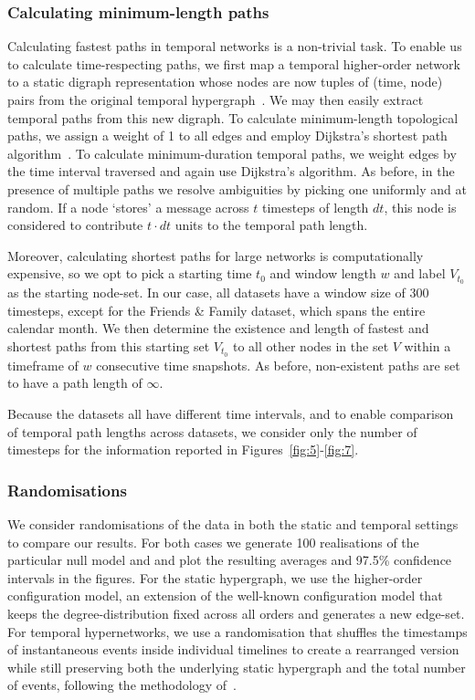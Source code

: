 \documentclass[a4paper,pre,reqno,superscriptaddress, twocolumn, floatfix]{revtex4}
\def\ho{higher-order }
\begin{document}
\subsubsection*{Calculating minimum-length paths}


Calculating fastest paths in temporal networks is a non-trivial task. To enable us to calculate time-respecting paths, we first map a temporal \ho network to a static digraph representation whose nodes are now tuples of (time, node) pairs from the original temporal hypergraph~\cite{valdano2015analytical, sato2019dyane}. We may then easily extract temporal paths from this new digraph. To calculate minimum-length topological paths, we assign a weight of 1 to all edges and employ Dijkstra's shortest path algorithm~\cite{cormen2001section}. To calculate minimum-duration temporal paths, we weight edges by the time interval traversed and again use Dijkstra's algorithm.  As before, in the presence of multiple paths we resolve ambiguities by picking one uniformly and at random. If a node `stores' a message across $t$ timesteps of length $dt$, this node is considered to contribute $t\cdot{dt}$ units to the temporal path length. 

Moreover, calculating shortest paths for large networks is computationally expensive, so we opt to pick a starting time $t_0$ and window length $w$ and label $V_{t_0}$ as the starting node-set. In our case, all datasets have a window size of 300 timesteps, except for the Friends \& Family dataset, which spans the entire calendar month. We then determine the existence and length of fastest and shortest paths from this starting set $V_{t_0}$ to all other nodes in the set $V$ within a timeframe of $w$ consecutive time snapshots. As before, non-existent paths are set to have a path length of $\infty$.

Because the datasets all have different time intervals, and to enable comparison of temporal path lengths across datasets, we consider only the number of timesteps for the information reported in Figures~\ref{fig:5}-\ref{fig:7}. 


\subsubsection*{Randomisations}


We consider randomisations of the data in both the static and temporal settings to compare our results.
For both cases we generate 100 realisations of the particular null model and and plot the resulting averages and 97.5\% confidence intervals in the figures. 
For the static hypergraph, we use the \ho configuration model, an extension of the well-known configuration model that keeps the degree-distribution fixed across all orders and generates a new edge-set. 
For temporal hypernetworks, we use a randomisation that shuffles the timestamps of instantaneous events inside individual timelines  to create a rearranged version while still preserving both the underlying static hypergraph and the total number of events, following the methodology of~\cite{gauvin2022randomized}.
\end{document}
